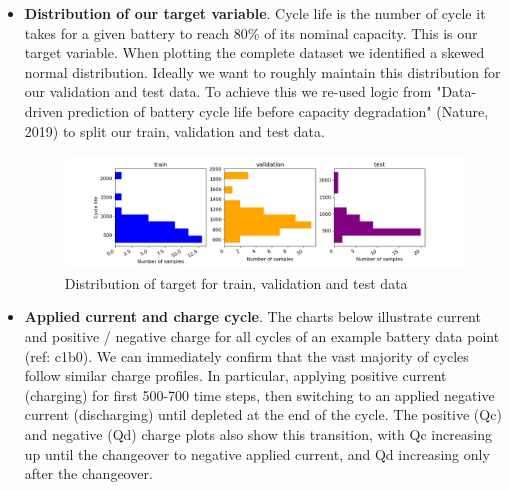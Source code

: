 \begin{itemize}
    \item \textbf{Distribution of our target variable}. Cycle life is the number of cycle it takes for a given battery to reach 80\% of its nominal capacity. This is our target variable. When plotting the complete dataset we identified a skewed normal distribution. Ideally we want to roughly maintain this distribution for our validation and test data. To achieve this we re-used logic from "Data-driven prediction of battery cycle life before capacity degradation" (Nature, 2019)\cite{severson2019data} to split our train, validation and test data.

        \begin{figure}[H]
            \centering
            \includegraphics[scale=0.5] {figs/histogram_cycle_life_traintest.png}
            \caption{Distribution of target for train, validation and test data}
            \label{fig:1b}
        \end{figure}

    \item \textbf{Applied current and charge cycle}. The charts below illustrate current and positive / negative charge for all cycles of an example battery data point (ref: c1b0). We can immediately confirm that the vast majority of cycles follow similar charge profiles. In particular, applying positive current (charging) for first 500-700 time steps, then switching to an applied negative current (discharging) until depleted at the end of the cycle. The positive (Qc) and negative (Qd) charge plots also show this transition, with Qc increasing up until the changeover to negative applied current, and Qd increasing only after the changeover.


\end{itemize}
